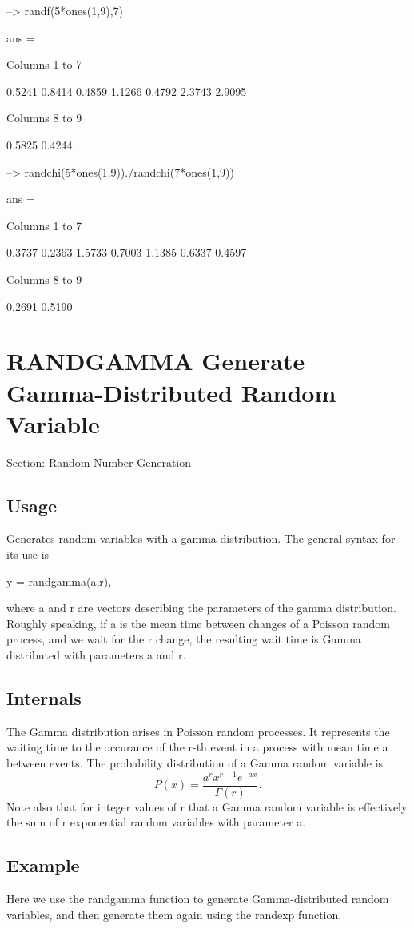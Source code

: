 \begin{DoxyVerbInclude}
--> randf(5*ones(1,9),7)

ans = 

 Columns 1 to 7

    0.5241    0.8414    0.4859    1.1266    0.4792    2.3743    2.9095 

 Columns 8 to 9

    0.5825    0.4244 

--> randchi(5*ones(1,9))./randchi(7*ones(1,9))

ans = 

 Columns 1 to 7

    0.3737    0.2363    1.5733    0.7003    1.1385    0.6337    0.4597 

 Columns 8 to 9

    0.2691    0.5190 
\end{DoxyVerbInclude}
 \hypertarget{random_randgamma}{}\section{R\-A\-N\-D\-G\-A\-M\-M\-A Generate Gamma-\/\-Distributed Random Variable}\label{random_randgamma}
Section\-: \hyperlink{sec_random}{Random Number Generation} \hypertarget{vtkwidgets_vtkxyplotwidget_Usage}{}\subsection{Usage}\label{vtkwidgets_vtkxyplotwidget_Usage}
Generates random variables with a gamma distribution. The general syntax for its use is \begin{DoxyVerb}   y = randgamma(a,r),
\end{DoxyVerb}
 where {\ttfamily a} and {\ttfamily r} are vectors describing the parameters of the gamma distribution. Roughly speaking, if {\ttfamily a} is the mean time between changes of a Poisson random process, and we wait for the {\ttfamily r} change, the resulting wait time is Gamma distributed with parameters {\ttfamily a} and {\ttfamily r}. \hypertarget{transforms_svd_Function}{}\subsection{Internals}\label{transforms_svd_Function}
The Gamma distribution arises in Poisson random processes. It represents the waiting time to the occurance of the {\ttfamily r}-\/th event in a process with mean time {\ttfamily a} between events. The probability distribution of a Gamma random variable is \[ P(x) = \frac{a^r x^{r-1} e^{-ax}}{\Gamma(r)}. \] Note also that for integer values of {\ttfamily r} that a Gamma random variable is effectively the sum of {\ttfamily r} exponential random variables with parameter {\ttfamily a}. \hypertarget{variables_struct_Example}{}\subsection{Example}\label{variables_struct_Example}
Here we use the {\ttfamily randgamma} function to generate Gamma-\/distributed random variables, and then generate them again using the {\ttfamily randexp} function.


